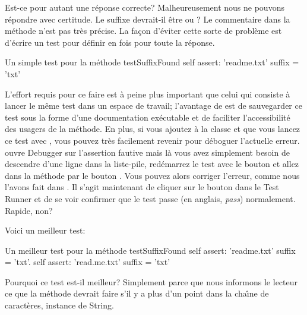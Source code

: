 \documentclass[a4paper,10pt,twoside]{book}
\begin{document}

Est-ce pour autant une r\'eponse correcte?  Malheureusement nous ne pouvons
r\'epondre avec certitude.
Le suffixe devrait-il \^etre  ou ?
Le commentaire dans la m\'ethode  n'est pas tr\`es pr\'ecise.
La fa\c{c}on d'\'eviter cette sorte de probl\`eme est d'\'ecrire
un test  pour d\'efinir en fois pour toute la r\'eponse.

\begin{method}[testSuffix]{Un simple test pour la m\'ethode }
testSuffixFound
	self assert: 'readme.txt' suffix = 'txt'
\end{method}

L'effort requis pour ce faire est \`a peine plus important que celui
qui consiste \`a lancer le m\^eme test dans un espace de travail;
l'avantage de \sunit est de sauvegarder ce test sous la forme d'une
documentation ex\'ecutable et de faciliter l'accessibilit\'e des usagers
de la m\'ethode.
En plus, si vous ajoutez  \`a la classe
 et que vous lancez ce test avec \sunit, vous
pouvez tr\`es facilement revenir pour d\'eboguer l'actuelle erreur.
\sunit ouvre Debugger sur l'assertion fautive mais l\`a vous
avez simplement besoin de descendre d'une ligne dans la liste-pile,
red\'emarrez le test avec le bouton  et allez
dans la m\'ethode  par le bouton . Vous
pouvez alors corriger l'erreur, comme nous l'avons fait dans
.
Il s'agit maintenant de cliquer sur le bouton  dans
le \sunit Test Runner et de se voir confirmer que le test passe (en anglais, \emph{pass}) normalement. Rapide, non?

Voici un meilleur test:

\begin{method}[testSuffix2]{Un meilleur test pour la m\'ethode }
testSuffixFound
	self assert: 'readme.txt' suffix = 'txt'.
	self assert: 'read.me.txt' suffix = 'txt'
\end{method}
\noindent
Pourquoi ce test est-il meilleur? Simplement parce que
nous informons le lecteur ce que la m\'ethode devrait faire 
s'il y a plus d'un point dans la cha\^{\i}ne de caract\`eres, instance de String.
\end{document}
